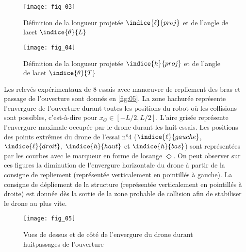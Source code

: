 \noindent
\begin{minipage}[c]{.48\linewidth}
\begin{figure}[H]
\centering
\texttt{[image: fig\_03]}
\caption{\label{fig:03} ­Définition de la longueur projetée $\indice{\ell}{proj}$ et de l’angle de lacet $\indice{\theta}{L}$}
\end{figure}
\end{minipage}\hspace{.5cm}
\begin{minipage}[c]{.48\linewidth}
\begin{figure}[H]
\centering
\texttt{[image: fig\_04]}
\caption{\label{fig:04} ­Définition de la longueur projetée $\indice{h}{proj}$ et de l’angle de lacet $\indice{\theta}{T}$}
\end{figure}
\end{minipage}

\vspace{.25cm}

Les relevés expérimentaux de 8 essais avec manœuvre de repliement des bras et passage de l’ouverture sont donnés en \autoref{fig:05}. La zone hachurée représente l’envergure de l’ouverture durant toutes les positions du robot où les collisions sont possibles, c’est­-à-­dire pour $x_G \in \left[-L/2, L/2 \right]$. L’aire grisée représente l’envergure maximale occupée par le drone durant les huit essais. Les positions des points extrêmes du drone de l’essai n°4 ($\indice{\ell}{gauche}$, $\indice{\ell}{droit}$, $\indice{h}{haut}$ et $\indice{h}{bas}$) sont représentées par les courbes avec le marqueur en forme de losange $\Diamond$. On
peut observer sur ces figures la diminution de l’envergure horizontale du drone à partir de la
consigne de repliement (représentée verticalement en pointillés à gauche). La consigne de
dépliement de la structure (représentée verticalement en pointillés à droite) est donnée dès
la sortie de la zone probable de collision afin de stabiliser le drone au plus vite.

\begin{figure}[H]
\centering
\texttt{[image: fig\_05]}
\caption{\label{fig:05} Vues de dessus et de côté de l’envergure du drone durant huitpassages de l’ouverture}
\end{figure}


\ifprof
\begin{corrige}
\end{corrige}
\else
\fi

